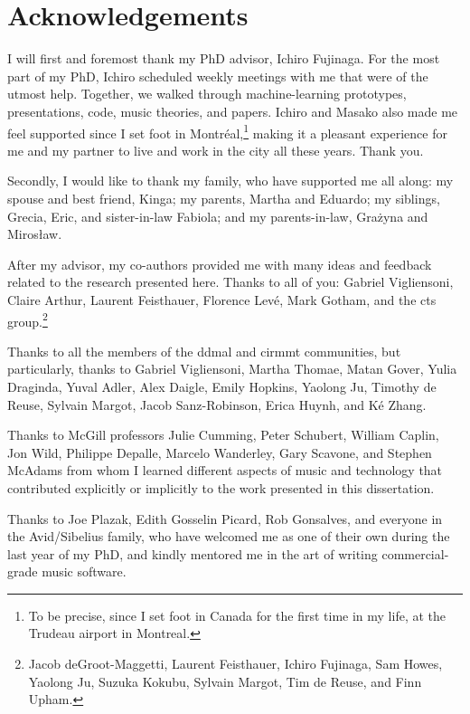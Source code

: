 \chapter*{Acknowledgements}
\label{chap:acknowledgements}

I will first and foremost thank my PhD advisor, Ichiro
Fujinaga. For the most part of my PhD, Ichiro scheduled
weekly meetings with me that were of the utmost help.
Together, we walked through machine-learning prototypes,
presentations, code, music theories, and papers. Ichiro and
Masako also made me feel supported since I set foot in
Montr\'eal,\footnote{To be precise, since I set foot in
Canada for the first time in my life, at the Trudeau airport
in Montreal.} making it a pleasant experience for me and my
partner to live and work in the city all these years. Thank
you.

Secondly, I would like to thank my family, who have
supported me all along: my spouse and best friend, Kinga; my
parents, Martha and Eduardo; my siblings, Grecia, Eric, and
sister-in-law Fabiola; and my parents-in-law, Gra\.zyna and
Miros\l{}aw.

After my advisor, my co-authors provided me with many ideas
and feedback related to the research presented here. Thanks
to all of you: Gabriel Vigliensoni, Claire Arthur, Laurent
Feisthauer, Florence Lev\'e, Mark Gotham, and the \gls{cts}
group.\footnote{Jacob deGroot-Maggetti, Laurent Feisthauer,
Ichiro Fujinaga, Sam Howes, Yaolong Ju, Suzuka Kokubu,
Sylvain Margot, Tim de Reuse, and Finn Upham.}

Thanks to all the members of the \gls{ddmal} and
\gls{cirmmt} communities, but particularly, thanks to
Gabriel Vigliensoni, Martha Thomae, Matan Gover, Yulia
Draginda, Yuval Adler, Alex Daigle, Emily Hopkins, Yaolong
Ju, Timothy de Reuse, Sylvain Margot, Jacob Sanz-Robinson,
Erica Huynh, and K\'e Zhang.

Thanks to McGill professors Julie Cumming, Peter Schubert,
William Caplin, Jon Wild, Philippe Depalle, Marcelo
Wanderley, Gary Scavone, and Stephen McAdams from whom I
learned different aspects of music and technology that
contributed explicitly or implicitly to the work presented
in this dissertation.

Thanks to Joe Plazak, Edith Gosselin Picard, Rob Gonsalves,
and everyone in the Avid/Sibelius family, who have welcomed
me as one of their own during the last year of my PhD, and
kindly mentored me in the art of writing commercial-grade
music software.

